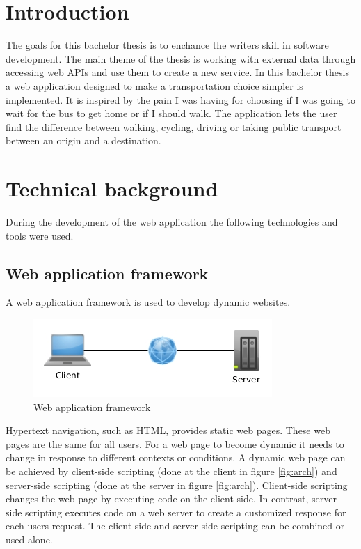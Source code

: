 \documentclass[10pt,a4paper]{article}
\begin{document}
\tableofcontents
\newpage
\section{Introduction}
The goals for this bachelor thesis is to enchance the writers skill in software development. The main theme of the thesis is working with external data through accessing web APIs and use them to create a new service. In this bachelor thesis a web application designed to make a transportation choice simpler is implemented. It is inspired by the pain I was having for choosing if I was going to wait for the bus to get home or if I should walk. The application lets the user find the difference between walking, cycling, driving or taking public transport between an origin and a destination.
\section{Technical background}
During the development of the web application the following technologies and tools were used.

\subsection{Web application framework}
A web application framework is used to develop dynamic websites. 
\begin{figure}[center]
  \centering
  \includegraphics[width=\linewidth]{../webframework/webframe}
  \caption{Web application framework}
  \label{fig:webapp}
\end{figure}


Hypertext navigation, such as HTML, provides static web pages. These web pages are the same for all users. For a web page to become dynamic it needs to change in response to different contexts or conditions. A dynamic web page can be achieved by client-side scripting (done at the client in figure \ref{fig:arch}) and server-side scripting (done at the server in figure \ref{fig:arch}). Client-side scripting changes the web page by executing code on the client-side. In contrast, server-side scripting executes code on a web server to create a customized response for each users request. The client-side and server-side scripting can be combined or used alone.
\end{document}
